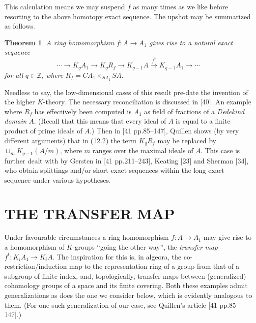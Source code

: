 \documentclass[openany,leqno]{book}  %
\newcommand{\Z}{\mathbb{Z}}
\newtheorem{theorem}{Theorem}[chapter]
\begin{document}
This calculation means we may suspend $f$ as many times as we like before resorting to the
above homotopy exact sequence. The upshot may be summarized as follows.
\begin{theorem}
A ring homomorphism $f \colon   A \longrightarrow  A_1$ gives rise to a natural exact sequence
\[\cdots \longrightarrow K_qA_1\longrightarrow K_qR_f\longrightarrow K_{q-1}A\overset{f^*}{\longrightarrow} K_{q-1}A_1\longrightarrow \cdots\]
for all $q\in \Z$, where $R_f = CA_1 \times_{SA_1}SA$.
\end{theorem}
Needless to say, the low-dimensional cases of this result pre-date the invention of the higher $K$-theory. The necessary reconciliation is discussed in [40]. An example where $R_f$ has effectively been computed is $A_1$ as field of fractions of a {\em Dedekind domain} $A$. (Recall that this means that every ideal of $A$ is equal to a finite product of prime ideals of $A$.) Then in [41 pp.85--147], Quillen shows (by very different arguments) that in (12.2) the term $K_qR_f$ may be replaced by
$\sqcup_{m} K_{q-1}(A/m)$, where $m$ ranges over the maximal ideals of $A$. This case is further dealt with by Gersten in [41 pp.211--243], Keating [23] and Sherman [34], who obtain splittings and/or short exact sequences within the long exact sequence under various hypotheses.
\section*{THE TRANSFER MAP}
Under favourable circumstances a ring homomorphism $f\colon   A \longrightarrow A_1$ may give rise to a homomorphism of $K$-groups ``going the other way'', the {\em transfer map} $f^t \colon   K_iA_1 \longrightarrow  K_iA$. The inspiration for this is, in algeora, the co-restriction/induction map to the representation ring of a group from
that of a subgroup of finite index, and, topologically, transfer maps between (generalized) cohomology groups of a space and its finite covering. Both these examples admit generalizations as does the one we consider below, which is evidently analogous to them. (For one such generalization of our case, see Quillen's article [41 pp.85--147].)
\end{document}
